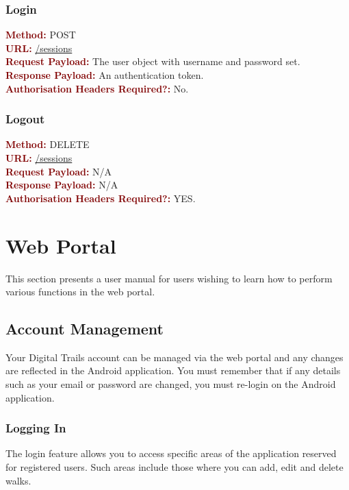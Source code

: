 \documentclass[11pt,a4paper]{report}
\begin{document}
\subsubsection{Login}
\textbf{\textcolor{Maroon}{Method:}} POST\\
\textbf{\textcolor{Maroon}{URL:}} \url{/sessions}\\
\textbf{\textcolor{Maroon}{Request Payload:}} The user object with username and password set.\\
\textbf{\textcolor{Maroon}{Response Payload:}} An authentication token.\\
\textbf{\textcolor{Maroon}{Authorisation Headers Required?:}} No.

\subsubsection{Logout}
\textbf{\textcolor{Maroon}{Method:}} DELETE\\
\textbf{\textcolor{Maroon}{URL:}} \url{/sessions}\\
\textbf{\textcolor{Maroon}{Request Payload:}} N/A\\
\textbf{\textcolor{Maroon}{Response Payload:}} N/A\\
\textbf{\textcolor{Maroon}{Authorisation Headers Required?:}} YES.


\section{Web Portal}

This section presents a user manual for users wishing to learn how to perform various functions in the web portal.

\subsection{Account Management}

Your Digital Trails account can be managed via the web portal and any changes are reflected in the Android application. You must remember that if any details such as your email or password are changed, you must re-login on the Android application.

\subsubsection{Logging In}

The login feature allows you to access specific areas of the application reserved for registered users. Such areas include those where you can add, edit and delete walks.
\end{document}
